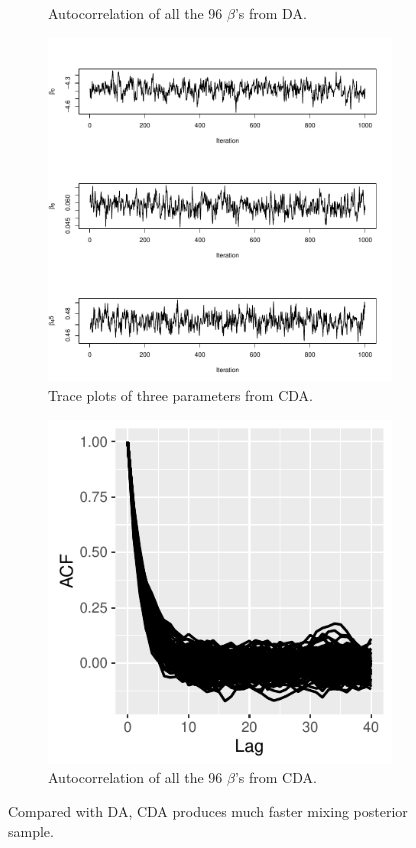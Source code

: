 \documentclass[10pt]{article}
\begin{document}
\begin{figure}[H]
\begin{subfigure}[b]{0.45\textwidth}
 \caption{Autocorrelation of all the 96 $\beta$'s from DA.}
   \label{acf_poi_da}
 \end{subfigure} 
  \begin{subfigure}[b]{0.45\textwidth}
 \includegraphics[width=1\textwidth]{traceplot_poisson_ada.pdf}
 \caption{Trace plots of three parameters from CDA.}
  \label{traceplot_poi_ada}
 \end{subfigure}
  \hfill 
 \begin{subfigure}[b]{0.45\textwidth}
 \includegraphics[width=1\textwidth]{poisson_ada_acf.pdf}
 \caption{Autocorrelation of all the 96 $\beta$'s from CDA.}
   \label{acf_poi_ada}
 \end{subfigure}
 \caption{Compared with DA, CDA produces much faster mixing posterior sample.}
 \label{data_poisson}
 \end{figure}
\end{document}
